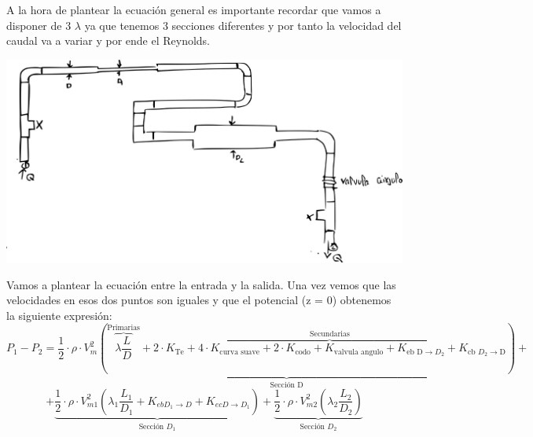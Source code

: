 \documentclass[10pt,a4paper]{article}
\begin{document}
A la hora de plantear la ecuación general es importante recordar que vamos a disponer de 3 $\lambda$ ya que tenemos 3 secciones diferentes y por tanto la velocidad del caudal va a variar y por ende el Reynolds.
\begin{center}
    \includegraphics[scale = 0.6]{Ejemplo Vector.png}
\end{center}
Vamos a plantear la ecuación entre la entrada y la salida. Una vez vemos que las velocidades en esos dos puntos son iguales y que el potencial (z = 0) obtenemos la siguiente expresión:
$$
P_1 - P_2 = \underbrace{\frac{1}{2} \cdot \rho \cdot V_m^2 \left(\overbrace{\lambda \frac{L}{D}}^{\text{Primarias}} + \overbrace{2\cdot K_{\text{Te}} + 4\cdot K_{\text{curva suave}} + 2\cdot K_{\text{codo}} + K_{\text{valvula angulo}} + K_{\text{eb D$\xrightarrow{}{}D_2$}} + K_{\text{cb $D_2 \xrightarrow{}$D}}}^{\text{Secundarias}}\right)}_{\text{Sección D}} + 
$$
$$
+ \underbrace{\frac{1}{2} \cdot \rho \cdot V_{m1}^2 \left(\lambda_1 \frac{L_1}{D_1} + K_{eb D_1 \xrightarrow{} D} + K_{ec D \xrightarrow{}D_1} \right)}_{\text{Sección $D_1$}} + \underbrace{\frac{1}{2} \cdot \rho \cdot V_{m2}^2 \left(\lambda_2 \frac{L_2}{D_2} \right)}_{\text{Sección $D_2$}}
$$

\newpage

\end{document}
